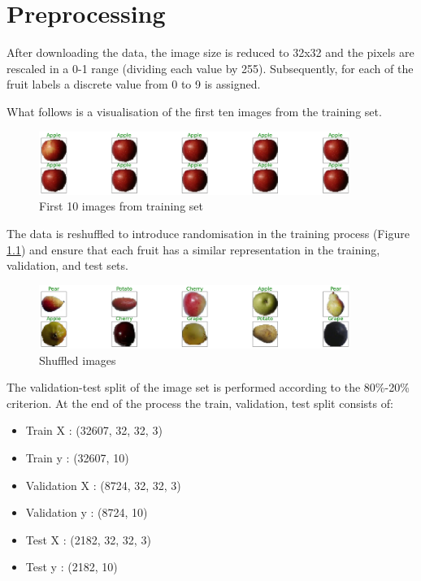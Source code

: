 \documentclass[10pt,english, openany]{book}
\begin{document}
\chapter{Preprocessing}
After downloading the data, the image size is reduced to 32x32 and the pixels are rescaled in a 0-1 range (dividing each value by 255). Subsequently, for each of the fruit labels a discrete value from 0 to 9 is assigned.

What follows is a visualisation of the first ten images from the training set.

\begin{figure}[h]
    \centering
    \includegraphics[width=0.9\textwidth]{Images/0.1. Visualisation of the first 10 images.png}
    \caption{ First 10 images from training set}
\end{figure}

The data is reshuffled to introduce randomisation in the training process (Figure \ref{fig:2.2}) and ensure that each fruit has a similar representation in the training, validation, and test sets.

\begin{figure}[h]
    \centering
    \includegraphics[width=0.9\textwidth]{Images/0.2.Visualisation 10 images shuffled.png}
    \caption{\label{fig:2.2}Shuffled images}
\end{figure}

The validation-test split of the image set is performed according to the 80\%-20\% criterion.
At the end of the process the train, validation, test split consists of:
\begin{itemize}
    \item Train X :  (32607, 32, 32, 3)
    \item Train y : (32607, 10)
    \item Validation X :  (8724, 32, 32, 3)
    \item Validation y : (8724, 10)
    \item Test X :  (2182, 32, 32, 3)
    \item Test y :  (2182, 10)
\end{itemize}
\end{document}
